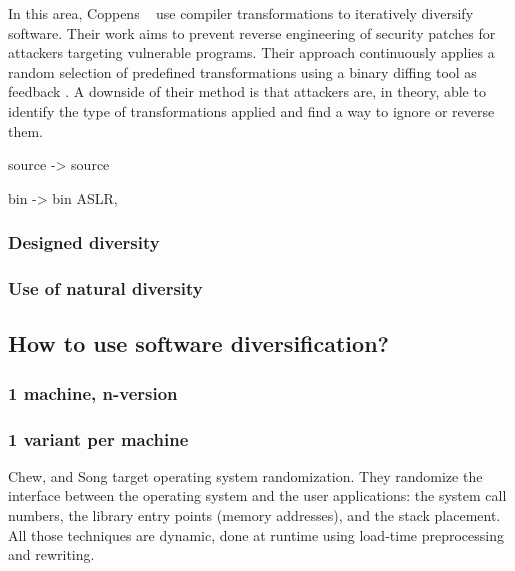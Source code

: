     In this area, Coppens \etal~\cite{coppens2013feedback} use compiler transformations to iteratively diversify software. Their work aims to prevent reverse engineering of security patches for attackers targeting vulnerable programs.
    Their approach continuously applies a random selection of predefined transformations using a binary diffing tool as feedback \citationneeded. 
    A downside of their method is that attackers are, in theory, able to identify the type of transformations applied and find a way to ignore or reverse them.

    source -> source 

    bin -> bin 
        ASLR, 
\subsubsection{Designed diversity}
\subsubsection{Use of natural diversity}


\subsection{How to use software diversification?}

\subsubsection{1 machine, n-version}



\subsubsection{1 variant per machine}




Chew, and Song \cite{Chew02mitigatingbuffer} target operating system randomization. They randomize the interface between the operating system and the user applications:
the system call numbers, the library entry points (memory addresses), and the stack placement. All those techniques are dynamic, done at runtime using load-time preprocessing and rewriting. 




